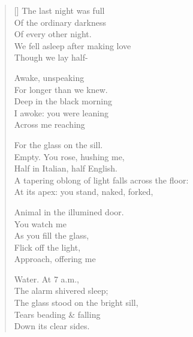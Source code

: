 \label{ch:last_night}
\settowidth{\versewidth}{A tapering oblong of light falls across the floor:}
\begin{verse}[\versewidth]
The last night was full\\
Of the ordinary darkness\\
Of every other night.\\
We fell asleep after making love\\
Though we lay half-

Awake, unspeaking\\
For longer than we knew.\\
Deep in the black morning\\
I awoke: you were leaning\\
Across me reaching

For the glass on the sill.\\
Empty. You rose, hushing me,\\
Half in Italian, half English.\\
A tapering oblong of light falls across the floor:\\
At its apex: you stand, naked, forked,

Animal in the illumined door.\\
You watch me\\
As you fill the glass,\\
Flick off the light,\\
Approach, offering me

Water. \hspace*{2\vgap} At 7 a.m.,\\
The alarm shivered sleep;\\
The glass stood on the bright sill,\\
Tears beading \& falling\\
Down its clear sides.
\end{verse}
